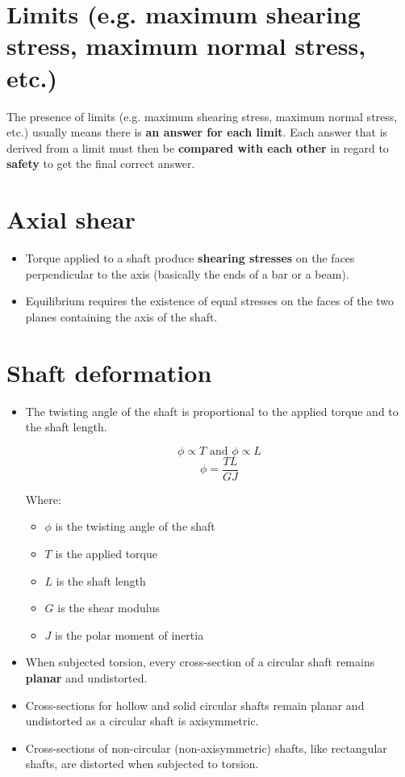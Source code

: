 \documentclass[11pt]{article}
\begin{document}
\section{Limits (e.g. maximum shearing stress, maximum normal stress, etc.)}
\label{sec:org0684656}
The presence of limits (e.g. maximum shearing stress, maximum normal stress, etc.) usually means there is \textbf{an answer for each limit}. Each answer that is derived from a limit must then be \textbf{compared with each other} in regard to \textbf{safety} to get the final correct answer.


\section{Axial shear}
\label{sec:orgf2f9e27}
\begin{itemize}
\item Torque applied to a shaft produce \textbf{shearing stresses} on the faces perpendicular to the axis (basically the ends of a bar or a beam).
\item Equilibrium requires the existence of equal stresses on the faces of the two planes containing the axis of the shaft.
\end{itemize}


\section{Shaft deformation}
\label{sec:org8dad8ee}
\begin{itemize}
\item The twisting angle of the shaft is proportional to the applied torque and to the shaft length.

\[\phi \propto T \text{ and } \phi \propto L\]
\[\phi = \frac{TL}{GJ}\]

Where:
\begin{itemize}
\item \(\phi\) is the twisting angle of the shaft
\item \(T\) is the applied torque
\item \(L\) is the shaft length
\item \(G\) is the shear modulus
\item \(J\) is the polar moment of inertia
\end{itemize}

\item When subjected torsion, every cross-section of a circular shaft remains \textbf{planar} and undistorted.
\item Cross-sections for hollow and solid circular shafts remain planar and undistorted as a circular shaft is axisymmetric.
\item Cross-sections of non-circular (non-axisymmetric) shafts, like rectangular shafts, are distorted when subjected to torsion.
\end{itemize}
\end{document}
